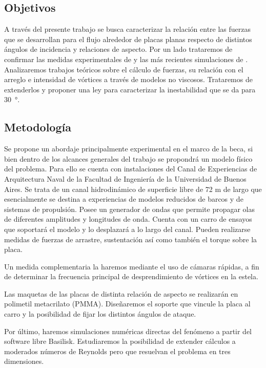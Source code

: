 \documentclass[spanish]{article}
\begin{document}
	
	

	
	\subsection*{Objetivos}
	A través del presente trabajo se busca caracterizar la relación entre las fuerzas que se desarrollan para el flujo alrededor de placas planas respecto de distintos ángulos de incidencia y relaciones de aspecto. Por un lado trataremos de confirmar las medidas experimentales de \citeauthor{eiffel1907recherches} y las más recientes simulaciones de \citeauthor{shademan2020effects}.
	Analizaremos trabajos teóricos\citep{fage1927flow,abernathy1962flow,kiya1977contribution} sobre el cálculo de fuerzas, su relación con el arreglo e intensidad de vórtices a través de  modelos no viscosos.  Trataremos  de extenderlos y proponer una ley para caracterizar la inestabilidad que se da para \SI{30}{\degree}.
	
	
	\subsection*{Metodología}
	
	Se propone un abordaje principalmente experimental en el marco de la beca, si bien dentro de los alcances generales del trabajo se propondrá un modelo físico del problema.
	Para ello se cuenta con instalaciones del Canal de Experiencias de Arquitectura Naval de la Facultad de Ingeniería de la Universidad de Buenos Aires. Se trata de un canal hidrodinámico de superficie libre de 72 m de largo que esencialmente se destina a experiencias de modelos reducidos de barcos y de sistemas de propulsión. Posee
	un generador de ondas que permite propagar olas de diferentes amplitudes y longitudes de onda. Cuenta con un carro de ensayos que soportará el modelo y lo desplazará a lo largo del canal. Pueden realizarse medidas de fuerzas de arrastre, sustentación así como también el  torque sobre la placa.
	
	Un medida complementaria la haremos mediante el uso de cámaras rápidas, a fin de determinar la frecuencia principal de desprendimiento de vórtices en la estela.
	
	Las maquetas de las placas de distinta relación de aspecto  se realizarán en polimetil metacrilato (PMMA). Diseñaremos el soporte que vincule la placa al carro y la posibilidad de fijar los distintos ángulos de ataque.
	
	Por último, haremos simulaciones numéricas directas del fenómeno a partir del software libre Basilisk\cite{popinet2014basilisk}.  Estudiaremos la posibilidad de extender cálculos a moderados números de Reynolds pero que resuelvan el problema en tres dimensiones.
\end{document}
